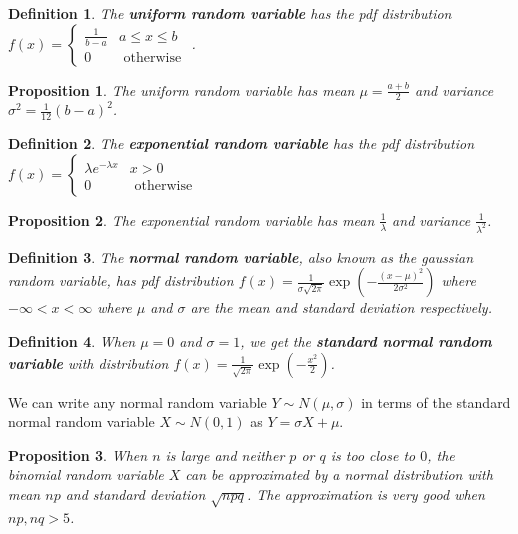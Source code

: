 \documentclass[14pt,twoside]{extreport}
\theoremstyle{dotless}
\newtheorem*{defn}{\footnotesize Definition}
\newtheorem*{prop}{\footnotesize Proposition} %
\begin{document}
\begin{defn}    
    The \textbf{uniform random variable} has the pdf distribution $f(x) = \begin{cases} \frac{1}{b-a} & a \leq x \leq b \\ 0 & \text { otherwise }\end{cases}$.
\end{defn}

\begin{prop}
The uniform random variable has mean $\mu = \frac{a + b}{2}$ and variance $\sigma^2 = \frac{1}{12} (b-a)^2$.
\end{prop}

\begin{defn}
    The \textbf{exponential random variable} has the pdf distribution $f(x) = \begin{cases} \lambda e^{-\lambda x} & x > 0 \\ 0 & \text{ otherwise } \end{cases}$
\end{defn}

\begin{prop}
The exponential random variable has mean $\frac{1}{\lambda}$ and variance $\frac{1}{\lambda^2}$.
\end{prop}

\begin{defn}
    The \textbf{normal random variable}, also known as the gaussian random variable, has pdf distribution $f(x) = \displaystyle \frac{1}{\sigma \sqrt{2 \pi}}  \exp\left(\displaystyle - \frac{(x-\mu)^2}{2 \sigma^2}\right)$ where $-\infty < x < \infty$ where $\mu$ and $\sigma$ are the mean and standard deviation respectively.
\end{defn}

\begin{defn}
When $\mu = 0$ and $\sigma = 1$, we get the \textbf{standard normal random variable} with distribution $f(x) = \displaystyle\frac{1}{\sqrt{2\pi}} \exp(-\frac{x^2}{2})$.
\end{defn}

We can write any normal random variable $Y \sim N(\mu, \sigma)$ in terms of the standard normal random variable $X \sim N(0,1)$ as $Y = \sigma X + \mu$.

\begin{prop}
    When $n$ is large and neither $p$ or $q$ is too close to $0$, the binomial random variable $X$ can be approximated by a normal distribution with mean $np$ and standard deviation $\sqrt{npq}$. The approximation is very good when $np, nq > 5$.
\end{prop}
\end{document}
